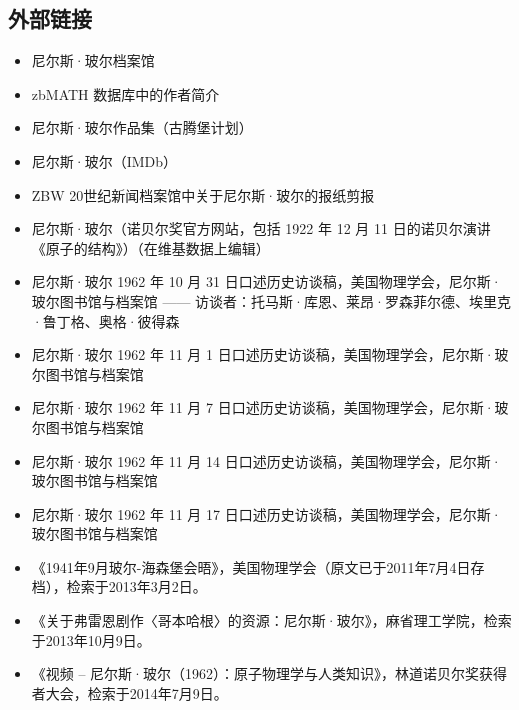 \subsection{外部链接}
\begin{itemize}
\item 尼尔斯·玻尔档案馆
\item zbMATH 数据库中的作者简介
\item 尼尔斯·玻尔作品集（古腾堡计划）
\item 尼尔斯·玻尔（IMDb）
\item ZBW 20世纪新闻档案馆中关于尼尔斯·玻尔的报纸剪报
\item 尼尔斯·玻尔（诺贝尔奖官方网站，包括 1922 年 12 月 11 日的诺贝尔演讲《原子的结构》）（在维基数据上编辑）
\item 尼尔斯·玻尔 1962 年 10 月 31 日口述历史访谈稿，美国物理学会，尼尔斯·玻尔图书馆与档案馆 —— 访谈者：托马斯·库恩、莱昂·罗森菲尔德、埃里克·鲁丁格、奥格·彼得森
\item 尼尔斯·玻尔 1962 年 11 月 1 日口述历史访谈稿，美国物理学会，尼尔斯·玻尔图书馆与档案馆
\item 尼尔斯·玻尔 1962 年 11 月 7 日口述历史访谈稿，美国物理学会，尼尔斯·玻尔图书馆与档案馆
\item 尼尔斯·玻尔 1962 年 11 月 14 日口述历史访谈稿，美国物理学会，尼尔斯·玻尔图书馆与档案馆
\item 尼尔斯·玻尔 1962 年 11 月 17 日口述历史访谈稿，美国物理学会，尼尔斯·玻尔图书馆与档案馆
\item 《1941年9月玻尔-海森堡会晤》，美国物理学会（原文已于2011年7月4日存档），检索于2013年3月2日。
\item 《关于弗雷恩剧作〈哥本哈根〉的资源：尼尔斯·玻尔》，麻省理工学院，检索于2013年10月9日。
\item 《视频 – 尼尔斯·玻尔（1962）：原子物理学与人类知识》，林道诺贝尔奖获得者大会，检索于2014年7月9日。
\end{itemize}